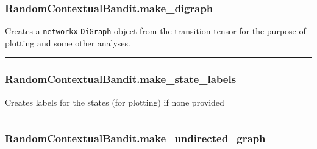 \subsubsection{RandomContextualBandit.make\_digraph}\label{randomcontextualbandit.make_digraph}

\begin{Shaded}
\begin{Highlighting}[]
\NormalTok{)}
\end{Highlighting}
\end{Shaded}

Creates a \texttt{networkx} \texttt{DiGraph} object from the transition
tensor for the purpose of plotting and some other analyses.

\begin{center}\rule{0.5\linewidth}{\linethickness}\end{center}

\subsubsection{RandomContextualBandit.make\_state\_labels}\label{randomcontextualbandit.make_state_labels}

\begin{Shaded}
\begin{Highlighting}[]
\NormalTok{)}
\end{Highlighting}
\end{Shaded}

Creates labels for the states (for plotting) if none provided

\begin{center}\rule{0.5\linewidth}{\linethickness}\end{center}

\subsubsection{RandomContextualBandit.make\_undirected\_graph}\label{randomcontextualbandit.make_undirected_graph}

\begin{Shaded}
\begin{Highlighting}[]
\NormalTok{)}
\end{Highlighting}
\end{Shaded}

